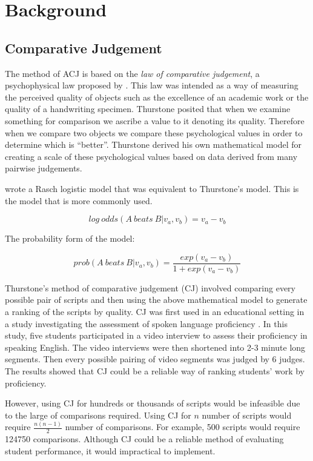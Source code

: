 \documentclass{l4proj}
\begin{document}
\chapter{Background}

\section{Comparative Judgement}
The method of ACJ is based on the \emph{law of comparative judgement}, a psychophysical law proposed by \citet{thurstone1927law}. This law was intended as a way of measuring the perceived quality of objects such as the excellence of an academic work or the quality of a handwriting specimen. Thurstone posited that when we examine something for comparison we ascribe a value to it denoting its quality. Therefore when we compare two objects we compare these psychological values in order to determine which is “better”. Thurstone derived his own mathematical model for creating a scale of these psychological values based on data derived from many pairwise judgements.

\citet{andrich1978relationships} wrote a Rasch logistic model that was equivalent to Thurstone’s model. This is the model that is more commonly used.

\[log\: odds(A\: beats\: B|v_a,v_b) = v_a - v_b\]

The probability form of the model: 

\[prob(A\: beats\: B|v_a,v_b) = \frac{exp(v_a - v_b)}{1 + exp(v_a - v_b)}\]

Thurstone's method of comparative judgement (CJ) involved comparing every possible pair of scripts and then using the above mathematical model to generate a ranking of the scripts by quality. CJ was first used in an educational setting in a study investigating the assessment of spoken language proficiency \citep{pollitt1996raters} . In this study, five students participated in a video interview to assess their proficiency in speaking English. The video interviews were then shortened into 2-3 minute long segments. Then every possible pairing of video segments was judged by 6 judges. The results showed that CJ could be a reliable way of ranking students’ work by proficiency.

However, using CJ for hundreds or thousands of scripts would be infeasible due to the large of comparisons required. Using CJ for \(n\) number of scripts would require \(\frac{n(n-1)}{2}\) number of comparisons. For example, 500 scripts would require 124750 comparisons. Although CJ could be a reliable method of evaluating student performance, it would impractical to implement.
\end{document}
